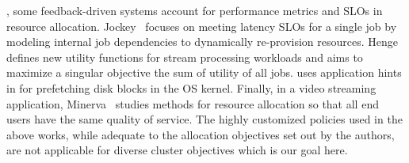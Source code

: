 , some feedback-driven systems account
 for performance metrics and SLOs in resource allocation.
Jockey~\cite{jockey} focuses on meeting latency SLOs for a single job by modeling
internal job dependencies to dynamically re-provision resources.
Henge~\cite{kalim2018henge} defines new utility functions for stream processing workloads and aims to maximize a singular objective \cameratext{--} the sum of utility of all jobs.
\cite{patterson1995informed} uses application hints in for prefetching disk blocks in the OS kernel. 
Finally, in a video streaming application, Minerva~\cite{nathan2019end} studies methods for 
resource allocation so that all end users have the same quality of service.
The highly customized policies used in the above works, while adequate to the allocation
objectives set out by the
authors, are not applicable for diverse cluster objectives which is our goal here.


